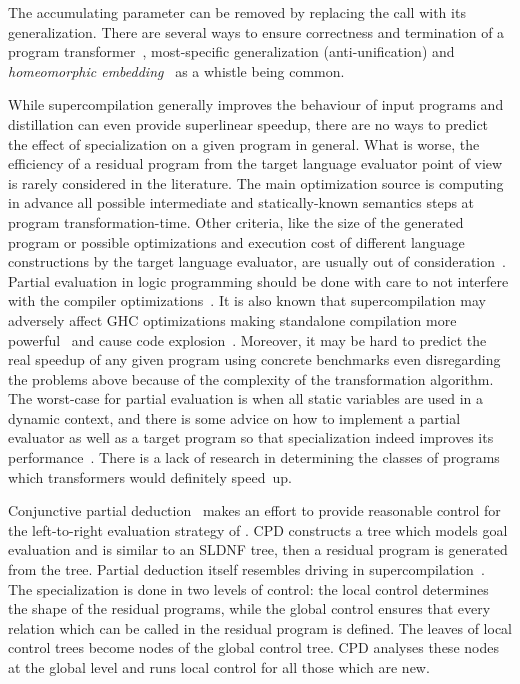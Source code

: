 The accumulating parameter can be removed by replacing the call with its generalization.
There are several ways to ensure correctness and termination of a program transformer~\cite{sorensen1998convergence}, most-specific generalization
(anti-unification) and \emph{homeomorphic embedding}~\cite{Higman52,Kruskal60} as a
whistle being common.

While supercompilation generally improves the behaviour of input programs and distillation can even provide superlinear speedup, there are no ways to predict the effect of specialization on a given program in general.
What is worse, the efficiency of a residual program from the target language evaluator point of view is rarely considered in the literature.
The main optimization source is computing in advance all possible intermediate and statically-known semantics steps at program transformation-time.
Other criteria, like the size of the generated program or possible optimizations and execution cost of different language constructions by the target language evaluator, are usually out of consideration~\cite{jonesbook}.
Partial evaluation in logic programming should be done with care to not interfere with the compiler optimizations~\cite{venken1988partial}.
It is also known that supercompilation may adversely affect GHC optimizations making standalone compilation more powerful~\cite{SCBE,TCES} and cause code explosion~\cite{SCHC}.
Moreover, it may be hard to predict the real speedup of any given program using concrete benchmarks even disregarding the problems above because of the complexity of the transformation algorithm.
The worst-case for partial evaluation is when all static variables are used in a dynamic context, and there is some advice on how to implement a partial evaluator as well as a target program so that specialization indeed improves its performance~\cite{jonesbook,bulyonkov84}.
There is a lack of research in determining the classes of programs which transformers would definitely speed~up.

Conjunctive partial deduction~\cite{de1999conjunctive} makes an effort to provide reasonable control for the left-to-right evaluation strategy of \pro.
CPD constructs a tree which models goal evaluation and is similar to an SLDNF tree, then a residual program is generated from the tree.
Partial deduction itself resembles driving in supercompilation~\cite{gluck1994partial}.
The specialization is done in two levels of control: the local control determines the shape of the residual programs, while the global control ensures that every relation which can be called in the residual program is defined.
The leaves of local control trees become nodes of the global control tree.
CPD analyses these nodes at the global level and runs local control for all those which are new.

